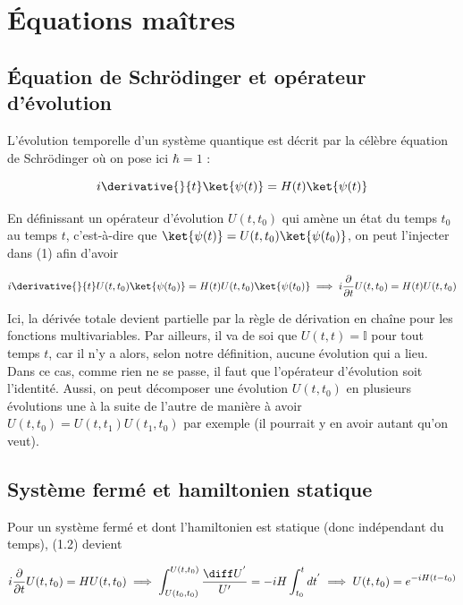 \section{Équations maîtres}
\subsection{Équation de Schrödinger et opérateur d'évolution}
\cite{BRE02} L'évolution temporelle d'un système quantique est décrit par la célèbre équation de Schrödinger où on pose ici $\hbar = 1$ :

\begin{equation}
    i\derivative{}{t}\ket{\psi(t)} = H(t)\ket{\psi(t)}
\end{equation}

En définissant un opérateur d'évolution $U(t,t_0)$ qui amène un état du temps $t_0$ au temps $t$, c'est-à-dire que $\ket{\psi(t)} = U(t,t_0)\ket{\psi(t_0)}$, on peut l'injecter dans (1) afin d'avoir 

\begin{equation}
    i \derivative{}{t}U(t,t_0)\ket{\psi(t_0)} = H(t)U(t,t_0)\ket{\psi(t_0)} \implies i \frac{\partial}{\partial t}U(t,t_0) = H(t)U(t,t_0)
\end{equation}

Ici, la dérivée totale devient partielle par la règle de dérivation en chaîne pour les fonctions multivariables. Par ailleurs, il va de soi que $U(t,t) = \mathbb{I}$ pour tout temps $t$, car il n'y a alors, selon notre définition, aucune évolution qui a lieu. Dans ce cas, comme rien ne se passe, il faut que l'opérateur d'évolution soit l'identité. Aussi, on peut décomposer une évolution $U(t, t_0)$ en plusieurs évolutions une à la suite de l'autre de manière à avoir $U(t,t_0) = U(t,t_1)U(t_1,t_0)$ par exemple (il pourrait y en avoir autant qu'on veut).

\subsection{Système fermé et hamiltonien statique}
Pour un système fermé et dont l'hamiltonien est statique (donc indépendant du temps), (1.2) devient

\begin{equation}
    i\frac{\partial}{\partial t}U(t,t_0) = HU(t,t_0) \implies \int_{U(t_0,t_0)}^{U(t,t_0)}\frac{\diff U^{'}}{U'} = -iH \int_{t_0}^{t}dt^{'} \implies U(t,t_0) = e^{-iH(t-t_0)}
\end{equation}

